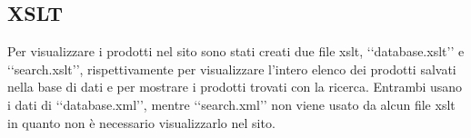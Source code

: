 {	\subsection{XSLT}
	Per visualizzare i prodotti nel sito sono stati creati due file xslt, ‘‘database.xslt’’ e ‘‘search.xslt’’, rispettivamente per visualizzare l'intero elenco dei prodotti salvati nella base di dati e per mostrare i prodotti trovati con la ricerca. Entrambi usano i dati di ‘‘database.xml’’, mentre ‘‘search.xml’’ non viene usato da alcun file xslt in quanto non è necessario visualizzarlo nel sito.
}